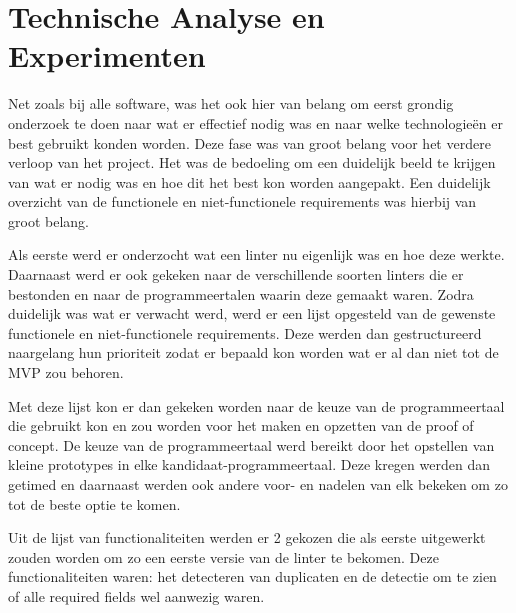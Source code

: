 \chapter{Technische Analyse en Experimenten}
\label{ch:fase2}

Net zoals bij alle software, was het ook hier van belang om eerst grondig onderzoek te doen naar wat er effectief nodig was en naar welke technologieën er best gebruikt konden worden.
Deze fase was van groot belang voor het verdere verloop van het project. Het was de bedoeling om een duidelijk beeld te krijgen van wat er nodig was en hoe dit het best kon worden aangepakt. Een duidelijk overzicht van de functionele en niet-functionele requirements was hierbij van groot belang. 

Als eerste werd er onderzocht wat een linter nu eigenlijk was en hoe deze werkte. Daarnaast werd er ook gekeken naar de verschillende soorten linters die er bestonden en naar de programmeertalen waarin deze gemaakt waren. Zodra duidelijk was wat er verwacht werd, werd er een lijst opgesteld van de gewenste functionele en niet-functionele requirements. Deze werden dan gestructureerd naargelang hun prioriteit zodat er bepaald kon worden wat er al dan niet tot de MVP zou behoren.

Met deze lijst kon er dan gekeken worden naar de keuze van de programmeertaal die gebruikt kon en zou worden voor het maken en opzetten van de proof of concept. De keuze van de programmeertaal werd bereikt door het opstellen van kleine prototypes in elke kandidaat-programmeertaal. Deze kregen werden dan getimed en daarnaast werden ook andere voor- en nadelen van elk bekeken om zo tot de beste optie te komen.

Uit de lijst van functionaliteiten werden er 2 gekozen die als eerste uitgewerkt zouden worden om zo een eerste versie van de linter te bekomen. Deze functionaliteiten waren: het detecteren van duplicaten en de detectie om te zien of alle required fields wel aanwezig waren.

